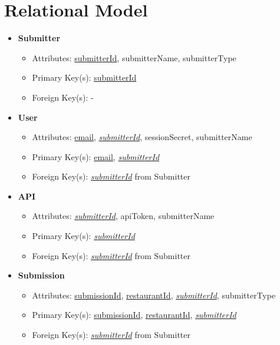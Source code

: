 \documentclass{article}
\begin{document}
\section{Relational Model}
    \begin{itemize}
        \item \textbf{Submitter}        
        \begin{itemize}
            \item Attributes: \underline{submitterId}, submitterName, submitterType
            \item Primary Key(s): \underline{submitterId}
            \item Foreign Key(s): -
        \end{itemize}

        \item \textbf{User}
        \begin{itemize}
            \item Attributes: \underline{email}, \underline{\textit{submitterId}}, sessionSecret, submitterName
            \item Primary Key(s): \underline{email}, \underline{\textit{submitterId}}
            \item Foreign Key(s): \underline{\textit{submitterId}} from Submitter
        \end{itemize}

        \item \textbf{API}
        \begin{itemize}
            \item Attributes: \underline{\textit{submitterId}}, apiToken, submitterName
            \item Primary Key(s): \underline{\textit{submitterId}}
            \item Foreign Key(s): \underline{\textit{submitterId}} from Submitter
        \end{itemize}

        \item \textbf{Submission}                
        \begin{itemize}
            \item Attributes: \underline{submissionId}, \underline{restaurantId}, \underline{\textit{submitterId}}, submitterType
            \item Primary Key(s): \underline{submissionId}, \underline{restaurantId}, \underline{\textit{submitterId}}
            \item Foreign Key(s): \underline{\textit{submitterId}} from Submitter
        \end{itemize}


\end{itemize}
\end{document}

